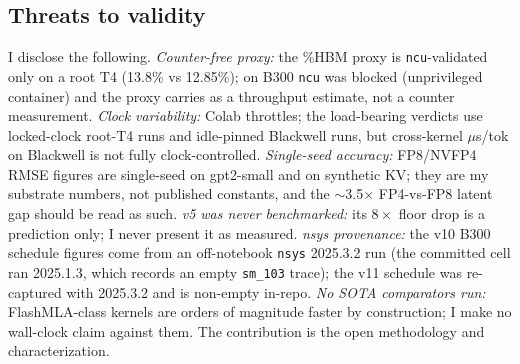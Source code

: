 \subsection{Threats to validity}
\label{sec:threats}
I disclose the following.
\emph{Counter-free proxy:} the \%HBM proxy is \texttt{ncu}-validated only on a
root T4 (13.8\% vs 12.85\%); on B300 \texttt{ncu} was blocked
(unprivileged container) and the proxy carries as a throughput estimate, not a
counter measurement.
\emph{Clock variability:} Colab throttles; the load-bearing verdicts use
locked-clock root-T4 runs and idle-pinned Blackwell runs, but cross-kernel
$\mu$s/tok on Blackwell is not fully clock-controlled.
\emph{Single-seed accuracy:} FP8/NVFP4 RMSE figures are single-seed on
gpt2-small and on synthetic KV; they are my substrate numbers, not published
constants, and the $\sim$3.5$\times$ FP4-vs-FP8 latent gap should be read as such.
\emph{v5 was never benchmarked:} its $8\times$ floor drop is a prediction only;
I never present it as measured.
\emph{nsys provenance:} the v10 B300 schedule figures come from an off-notebook
\texttt{nsys} 2025.3.2 run (the committed cell ran 2025.1.3, which records an
empty \texttt{sm\_103} trace); the v11 schedule was re-captured with 2025.3.2 and
is non-empty in-repo.
\emph{No SOTA comparators run:} FlashMLA-class kernels are orders of magnitude
faster by construction; I make no wall-clock claim against them. The
contribution is the open methodology and characterization.
